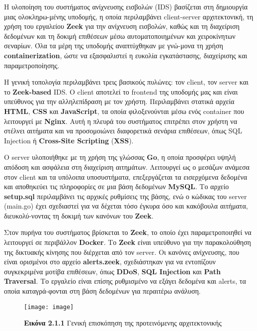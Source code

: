 Η υλοποίηση του συστήματος ανίχνευσης εισβολών (IDS) βασίζεται στη δημιουργία μιας ολοκληρω-μένης υποδομής, η οποία περιλαμβάνει client-server αρχιτεκτονική, τη χρήση του εργαλείου \textbf{Zeek} για την ανίχνευση εισβολών, καθώς και τη διαχείριση δεδομένων και τη δοκιμή επιθέσεων μέσω αυτοματοποιημένων και χειροκίνητων σεναρίων. Όλα τα μέρη της υποδομής αναπτύχθηκαν με γνώ-μονα τη χρήση \textbf{containerization}, ώστε να εξασφαλιστεί η ευκολία εγκατάστασης, διαχείρισης και παραμετροποίησης.

Η γενική τοπολογία περιλαμβάνει τρεις βασικούς πυλώνες: τον client, τον server και το \textbf{Zeek-based} IDS. Ο client αποτελεί το frontend της υποδομής μας και είναι υπεύθυνος για την αλληλεπίδραση με τον χρήστη. Περιλαμβάνει στατικά αρχεία \textbf{HTML}, \textbf{CSS} και \textbf{JavaScript}, τα οποία φιλοξενούνται μέσω ενός container που λειτουργεί με \textbf{Nginx}. Αυτή η πλευρά του συστήματος επιτρέπει στον χρήστη να στέλνει αιτήματα και να προσομοιώνει διαφορετικά σενάρια επιθέσεων, όπως SQL Injection ή \textbf{Cross-Site Scripting} (\textbf{XSS}).

Ο server υλοποιήθηκε με τη χρήση της γλώσσας \textbf{Go}, η οποία προσφέρει υψηλή απόδοση και ασφάλεια στη διαχείριση αιτημάτων. Λειτουργεί ως ο μεσάζων ανάμεσα στον client και τα υπόλοιπα υποσυστήματα, επεξεργάζεται τα εισερχόμενα δεδομένα και αποθηκεύει τις πληροφορίες σε μια βάση δεδομένων \textbf{MySQL}. Το αρχείο \textbf{setup.sql} περιλαμβάνει τις αρχικές ρυθμίσεις της βάσης, ενώ ο κώδικας του server (main.go) έχει σχεδιαστεί για να δέχεται τόσο έγκυρα όσο και κακόβουλα αιτήματα, διευκολύ-νοντας τη δοκιμή των κανόνων του \textbf{Zeek}.

Στον πυρήνα του συστήματος βρίσκεται το \textbf{Zeek}, το οποίο έχει παραμετροποιηθεί να λειτουργεί σε περιβάλλον \textbf{Docker}. Το \textbf{Zeek} είναι υπεύθυνο για την παρακολούθηση της δικτυακής κίνησης που διέρχεται από τον server. Οι κανόνες ανίχνευσης, που είναι ορισμένοι στο αρχείο \textbf{alerts.zeek}, σχεδιάστηκαν για να εντοπίζουν συγκεκριμένα μοτίβα επιθέσεων, όπως \textbf{DDoS}, \textbf{SQL Injection} και \textbf{Path Traversal}. Το εργαλείο είναι επίσης ρυθμισμένο να εξάγει δεδομένα και alerts, τα οποία καταγρά-φονται στη βάση δεδομένων για περαιτέρω ανάλυση.

\begin{figure}[H]
\centering
\texttt{[image: image]}
\caption*{\small{\textbf{Εικόνα 2.1.1} Γενική επισκόπηση της προτεινόμενης αρχιτεκτονικής}}
\end{figure}

